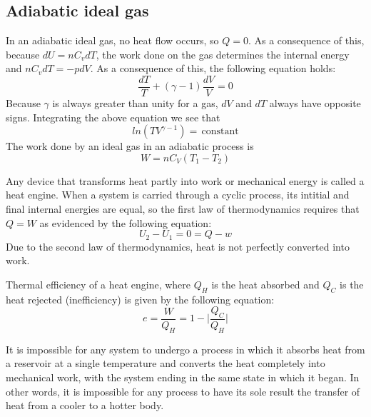 \documentclass[nobib,notoc]{tufte-handout}
\begin{document}
\subsection{Adiabatic ideal gas}
In an adiabatic ideal gas, no heat flow occurs, so \(Q=0\). As a consequence of this, because \(dU=nC_vdT\), the work done on the gas determines the internal energy and \(nC_vdT=-pdV\). As a consequence of this, the following equation holds:
\begin{equation*}
	\frac{dT}{T}+(\gamma -1)\frac{dV}{V}=0
\end{equation*}
Because \(\gamma\) is always greater than unity for a gas, \(dV\) and \(dT\) always have opposite signs. Integrating the above equation we see that
\begin{equation*}
	ln(TV^{\gamma-1})=\,\text{constant}
\end{equation*}
The work done by an ideal gas in an adiabatic process is
\begin{equation*}
	W=nC_V(T_1-T_2)
\end{equation*}
\begin{defi}
	Any device that transforms heat partly into work or mechanical energy is called a heat engine. When a system is carried through a cyclic process, its intitial and final internal energies are equal, so the first law of thermodynamics requires that \(Q=W\) as evidenced by the following equation:
	\begin{equation*}
		U_2-U_1=0=Q-w
	\end{equation*}
	Due to the second law of thermodynamics, heat is not perfectly converted into work.
\end{defi}
\begin{defi}
	Thermal efficiency of a heat engine, where \(Q_H\) is the heat absorbed and \(Q_C\) is the heat rejected (inefficiency) is given by the following equation:
	\begin{equation*}
		e=\frac{W}{Q_H}=1-\lvert\frac{Q_C}{Q_H}\lvert
	\end{equation*}
\end{defi}
\begin{defi}
	It is impossible for any system to undergo a process in which it absorbs heat from a reservoir at a single temperature and converts the heat completely into mechanical work, with the system ending in the same state in which it began.
	\medbreak
	In other words, it is impossible for any process to have its sole result the transfer of heat from a cooler to a hotter body.
\end{defi}
\end{document}
